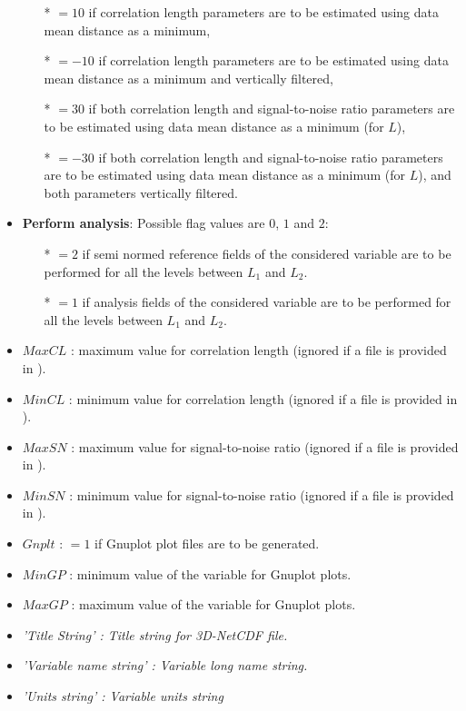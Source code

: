 \begin{itemize}
\begin{itemize}
                \item[*] $=10$ if correlation length parameters are to be estimated using data mean distance as a minimum,
                \item[*] $=-10$ if correlation length parameters are to be estimated using data mean distance as a minimum and vertically filtered,
                \item[*] $=30$ if both  correlation length and  signal-to-noise ratio parameters are to be estimated using data mean distance as a minimum (for $L$),
                \item[*] $=-30$ if both  correlation length and  signal-to-noise ratio parameters are to be estimated using data mean distance as a minimum (for $L$), and both parameters vertically filtered.
              \end{itemize}

\item {\bf Perform analysis}: Possible flag values are $0$, $1$ and $2$:
              \begin{itemize}
                \item[*] $=2$ if semi normed reference fields of the considered variable are to be performed for all the levels between $L_1$ and $L_2$.
                \item[*] $=1$ if analysis fields of the considered variable are to be performed for all the levels between $L_1$ and $L_2$.
              \end{itemize}
\item $MaxCL$ : maximum value for correlation length (ignored if a  file is provided in ).
\item $MinCL$ : minimum value for correlation length  (ignored if a  file is provided in ).
\item $MaxSN$ : maximum value for signal-to-noise ratio (ignored if a  file is provided in ).
\item $MinSN$ : minimum value for signal-to-noise ratio (ignored if a  file is provided in ).
\item $Gnplt$ : $=1$ if Gnuplot plot files are to be generated.
\item $MinGP$ : minimum value of the variable for Gnuplot plots.
\item $MaxGP$ : maximum value of the variable for Gnuplot plots.
\item \it{'Title String'} : Title string for 3D-NetCDF file.
\item \it{'Variable name string'} : Variable long name string.
\item \it{'Units string'} : Variable units string
\end{itemize}


